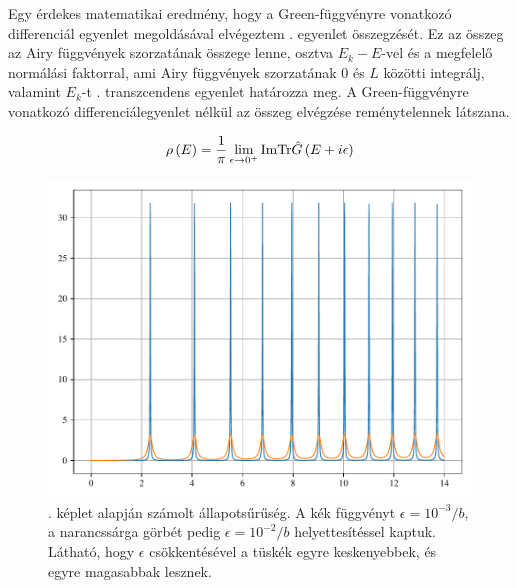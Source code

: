Egy érdekes matematikai eredmény, hogy a Green-függvényre vonatkozó differenciál egyenlet megoldásával elvégeztem . egyenlet összegzését. Ez az összeg az Airy függvények szorzatának összege lenne, osztva $E_k-E$-vel és a megfelelő normálási faktorral, ami Airy függvények szorzatának $0$ és $L$ közötti integrálj, valamint $E_k$-t . transzcendens egyenlet határozza meg. A Green-függvényre vonatkozó differenciálegyenlet nélkül az összeg elvégzése reménytelennek látszana.

\begin{equation}
	\rho\left(E\right) = \frac{1}{\pi}\lim_{\epsilon \to 0^+} \mathrm{Im}\mathrm{Tr}\hat{G}\left(E + i\epsilon\right)
	\label{green:densityeq}
\end{equation}
\begin{figure}[H]
	\includegraphics[scale=1]{./figs/dosfromgreen.pdf}
	\caption[Állapotsűrűség]{. képlet alapján számolt állapotsűrűség. A kék függvényt $\epsilon = 10^{-3}/b$, a narancssárga görbét pedig $\epsilon = 10^{-2}/b$ helyettesítéssel kaptuk. Látható, hogy $\epsilon$ csökkentésével a tüskék egyre keskenyebbek, és egyre magasabbak lesznek.}
	\label{green:állapotsűrség}
\end{figure}
